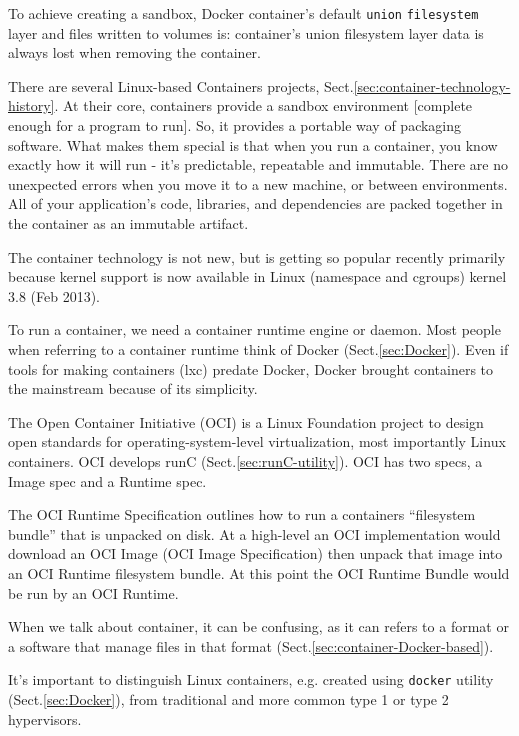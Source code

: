To achieve creating a sandbox, Docker container's default \verb!union!
\verb!filesystem! layer and files written to volumes is: container's union
filesystem layer data is always lost when removing the container.

There are several Linux-based Containers projects,
Sect.\ref{sec:container-technology-history}. At their core, containers provide a
sandbox environment [complete enough for a program to run].
So, it provides a portable way of packaging software. What makes them special is
that when you run a container, you know exactly how it will run - it’s
predictable, repeatable and immutable.
There are no unexpected errors when you move it to a new machine, or between
environments. All of your application’s code, libraries, and dependencies are
packed together in the container as an immutable artifact.

The container technology is not new, but is getting so popular recently
primarily because kernel support is now available in Linux (namespace and
cgroups) kernel 3.8 (Feb 2013).

To run a container, we need a container runtime engine or daemon.
Most people when referring to a container runtime think of Docker
(Sect.\ref{sec:Docker}). Even if tools for making containers (lxc) predate
Docker, Docker brought containers to the mainstream because of its simplicity.


\label{sec:OCI-runtime}
The Open Container Initiative (OCI) is a Linux Foundation project to design open
standards for operating-system-level virtualization, most importantly Linux
containers. OCI develops runC (Sect.\ref{sec:runC-utility}).
OCI has two specs, a Image spec and a Runtime spec.

The OCI Runtime Specification outlines how to run a containers “filesystem
bundle” that is unpacked on disk. At a high-level an OCI implementation would
download an OCI Image (OCI Image Specification) then unpack that image into an
OCI Runtime filesystem bundle. At this point the OCI Runtime Bundle would be run
by an OCI Runtime. 

When we talk about container, it can be confusing, as it can refers to a format
or a software that manage files in that format
(Sect.\ref{sec:container-Docker-based}). 

It’s important to distinguish Linux containers, e.g. created using \verb!docker!
utility (Sect.\ref{sec:Docker}), from traditional and more common type 1 or type
2 hypervisors.



